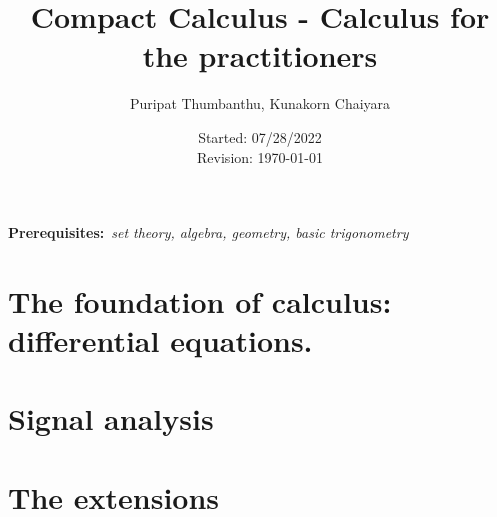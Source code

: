 \documentclass[b5paper, 11pt, openleft]{memoir}
\newcommand{\prerequisites}[1]{\textbf{Prerequisites:}~\emph{#1}}
\begin{document}
% 

\thispagestyle{empty}
\title{Compact Calculus - Calculus for the practitioners}
\author{Puripat Thumbanthu, Kunakorn Chaiyara}
\date{Started: 07/28/2022 \\Revision: \today}
\maketitle

\frontmatter

\prerequisites{set theory, algebra, geometry, basic trigonometry}

\tableofcontents*





\mainmatter

\part{The foundation of calculus: differential equations.}








% 

\part{Signal analysis}

% 
% 


% 
% 
% 
% 

\part{The extensions}




\end{document}
